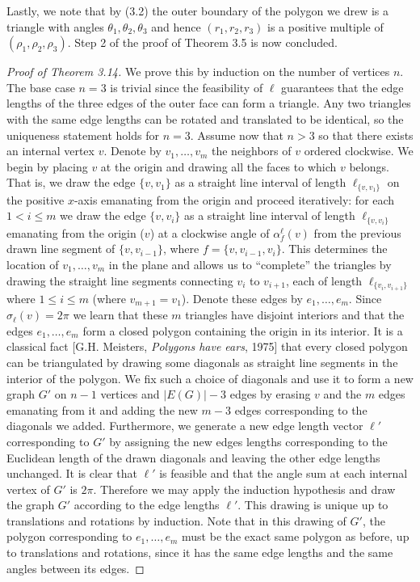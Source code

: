 \documentclass[UTF8,11pt]{ctexart}
\theoremstyle{definition}
\begin{document}
Lastly, we note that by (3.2) the outer boundary of the polygon we drew is a triangle with angles $\theta_1,\theta_2,\theta_3$ and hence $(r_1,r_2,r_3)$ is a positive multiple of $(\rho_1,\rho_2,\rho_3)$. Step 2 of the proof of Theorem 3.5 is now concluded.
\begin{proof}[Proof of Theorem 3.14]
We prove this by induction on the number of vertices $n$. The base case $n=3$ is trivial since the feasibility of $\boldsymbol\ell$ guarantees that the edge lengths of the three edges of the outer face can form a triangle. Any two triangles with the same edge lengths can be rotated and translated to be identical, so the uniqueness statement holds for $n=3$.
Assume now that $n>3$ so that there exists an internal vertex $v$. Denote by $v_1,\ldots,v_m$ the neighbors of $v$ ordered clockwise. We begin by placing $v$ at the origin and drawing all the faces to which $v$ belongs. That is, we draw the edge $\{v,v_1\}$ as a straight line interval of length $\ell_{\{v,v_1\}}$ on the positive $x$-axis emanating from the origin and proceed iteratively: for each $1<i\le m$ we draw the edge $\{v,v_i\}$ as a straight line interval of length $\ell_{\{v,v_i\}}$ emanating from the origin ($v$) at a clockwise angle of $\alpha_f^{\boldsymbol\ell}(v)$ from the previous drawn line segment of $\{v,v_{i-1}\}$, where $f=\{v,v_{i-1},v_i\}$.
This determines the location of $v_1,\ldots,v_m$ in the plane and allows us to ``complete'' the triangles by drawing the straight line segments connecting $v_i$ to $v_{i+1}$, each of length $\ell_{\{v_i,v_{i+1}\}}$ where $1\le i\le m$ (where $v_{m+1}=v_1$). Denote these edges by $e_1,\ldots,e_m$.
Since $\sigma_{\boldsymbol\ell}(v)=2\pi$ we learn that these $m$ triangles have disjoint interiors and that the edges $e_1,\ldots,e_m$ form a closed polygon containing the origin in its interior. It is a classical fact [G.H. Meisters, \emph{Polygons have ears}, 1975] that every closed polygon can be triangulated by drawing some diagonals as straight line segments in the interior of the polygon.
We fix such a choice of diagonals and use it to form a new graph $G'$ on $n-1$ vertices and $|E(G)|-3$ edges by erasing $v$ and the $m$ edges emanating from it and adding the new $m-3$ edges corresponding to the diagonals we added. Furthermore, we generate a new edge length vector $\boldsymbol\ell'$ corresponding to $G'$ by assigning the new edges lengths corresponding to the Euclidean length of the drawn diagonals and leaving the other edge lengths unchanged.
It is clear that $\boldsymbol\ell'$ is feasible and that the angle sum at each internal vertex of $G'$ is $2\pi$. Therefore we may apply the induction hypothesis and draw the graph $G'$ according to the edge lengths $\boldsymbol\ell'$. This drawing is unique up to translations and rotations by induction. Note that in this drawing of $G'$, the polygon corresponding to $e_1,\ldots,e_m$ must be the exact same polygon as before, up to translations and rotations, since it has the same edge lengths and the same angles between its edges.

\end{proof}
\end{document}
